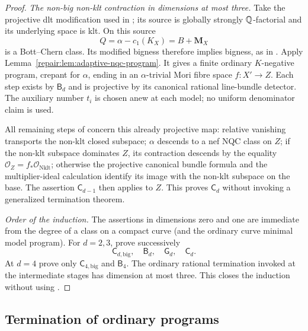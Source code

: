 \begin{proof}
\smallskip\noindent
\emph{The non-big non-klt contraction in dimensions at most three.}
Take the projective dlt modification used in
\cite[Section~6]{HX2026}; its source is globally strongly
$\mathbb Q$-factorial and its underlying space is klt. On this source
\[
 Q=\alpha-c_1(K_X)=B+\mathbf M_X
\]
is a Bott--Chern class. Its modified bigness therefore implies
bigness, as in \cite[Definition~2.8]{HX2026}. Apply
Lemma~\ref{repair:lem:adaptive-nqc-program}. It gives a finite ordinary
$K$-negative program, crepant for $\alpha$, ending in an
$\alpha$-trivial Mori fibre space $f:X'\to Z$. Each step exists
by $\mathsf B_d$ and is projective by its canonical rational
line-bundle detector. The auxiliary number $t_i$ is chosen anew
at each model; no uniform denominator claim is used.

All remaining steps of
\cite[Section~6]{HX2026} concern this already projective map:
relative vanishing transports the non-klt closed subspace;
$\alpha$ descends to a nef NQC class on $Z$; if the non-klt
subspace dominates $Z$, its contraction descends by the equality
$\mathcal O_Z=f_*\mathcal O_{\operatorname{Nklt}}$; otherwise
the projective canonical bundle formula and the multiplier-ideal
calculation identify its image with the non-klt subspace on the
base. The assertion $\mathsf C_{d-1}$ then applies to $Z$.
This proves $\mathsf C_d$ without invoking a generalized termination theorem.

\smallskip\noindent
\emph{Order of the induction.}
The assertions in dimensions zero and one are immediate from
the degree of a class on a compact curve (and the ordinary curve
minimal model program). For $d=2,3$, prove successively
\[
 \mathsf C_{d,\mathrm{big}},\quad
 \mathsf B_d,\quad \mathsf G_d,\quad\mathsf C_d.
\]
At $d=4$ prove only $\mathsf C_{4,\mathrm{big}}$ and
$\mathsf B_4$. The ordinary rational termination invoked at the
intermediate stages has dimension at most three. This closes
the induction without using \cite[Theorems~1.5 or~5.15]{HX2026}.
\end{proof}
\subsection{Termination of ordinary programs}\label{repair:sec:reduction}

